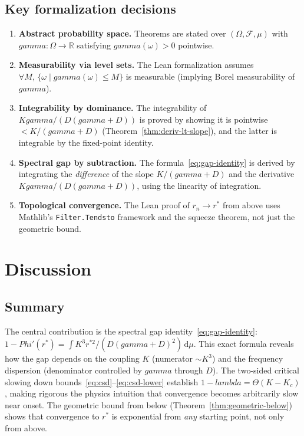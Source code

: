 \documentclass[11pt,a4paper]{article}
\let\Phi\relax\def\Phi{Phi}%
\let\lambda\relax\def\lambda{lambda}%
\let\gamma\relax\def\gamma{gamma}%
\theoremstyle{definition}
\newcommand{\R}{\mathbb{R}}
\begin{document}
\subsection{Key formalization decisions}

\begin{enumerate}[nosep]
\item \textbf{Abstract probability space.} Theorems are stated over $(\Omega, \mathcal{F}, \mu)$ with $\gamma : \Omega \to \R$ satisfying $\gamma(\omega) > 0$ pointwise.

\item \textbf{Measurability via level sets.} The Lean formalization assumes $\forall M,\, \{\omega \mid \gamma(\omega) \leq M\}$ is measurable (implying Borel measurability of $\gamma$).

\item \textbf{Integrability by dominance.} The integrability of $K\gamma/(D(\gamma+D))$ is proved by showing it is pointwise $< K/(\gamma+D)$ (Theorem~\ref{thm:deriv-lt-slope}), and the latter is integrable by the fixed-point identity.

\item \textbf{Spectral gap by subtraction.} The formula~\eqref{eq:gap-identity} is derived by integrating the \emph{difference} of the slope $K/(\gamma+D)$ and the derivative $K\gamma/(D(\gamma+D))$, using the linearity of integration.

\item \textbf{Topological convergence.} The Lean proof of $r_n \to r^*$ from above uses Mathlib's \texttt{Filter.Tendsto} framework and the squeeze theorem, not just the geometric bound.
\end{enumerate}

\section{Discussion}\label{sec:discussion}

\subsection{Summary}

The central contribution is the spectral gap identity~\eqref{eq:gap-identity}: $1 - \Phi'(r^*) = \int K^3 r^{*2}/(D(\gamma+D)^2)\,\mathrm{d}\mu$. This exact formula reveals how the gap depends on the coupling $K$ (numerator $\sim K^3$) and the frequency dispersion (denominator controlled by $\gamma$ through $D$). The two-sided critical slowing down bounds~\eqref{eq:csd}--\eqref{eq:csd-lower} establish $1-\lambda = \Theta(K-K_c)$, making rigorous the physics intuition that convergence becomes arbitrarily slow near onset. The geometric bound from below (Theorem~\ref{thm:geometric-below}) shows that convergence to $r^*$ is exponential from \emph{any} starting point, not only from above.
\end{document}
